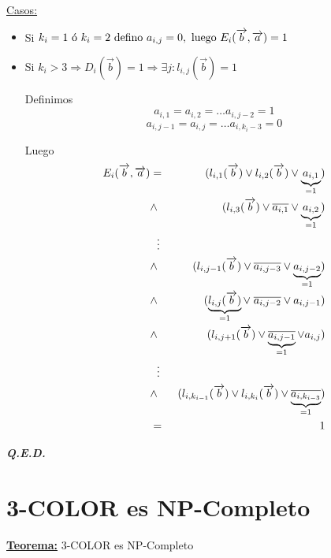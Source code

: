 \documentclass[12pt,a4paper]{report}
\newcommand{\QED}{\hfill \textit{\textbf{Q.E.D.}}}
\begin{document}
					\vspace{3mm}
					\underline{Casos:}
					\begin{itemize}
						\item Si $k_{i} = 1 \textup{ ó } k_{i} = 2 \textup{ defino } a_{i, j} = 0, \textup{ luego } E_{i}(\overrightarrow{b}, \overrightarrow{a}) = 1$
						\item Si $k_{i} > 3 \Rightarrow D_{i}(\overrightarrow{b}) = 1 \Rightarrow \exists j : l_{i, j}(\overrightarrow{b}) = 1$

							\par Definimos
								\[ a_{i, 1} = a_{i, 2} = \dotsc a_{i, j - 2} = 1 \]
								\[ a_{i, j - 1} = a_{i, j} = \dotsc a_{i, k_{i} - 3} = 0 \]

							\par Luego
							\begin{eqnarray}
								\nonumber E_{i}(\overrightarrow{b}, \overrightarrow{a}) &=& (l_{i, 1}(\overrightarrow{b}) \vee l_{i, 2}(\overrightarrow{b}) \vee \underbrace{a_{i, 1}}_{= 1}) \\
								\nonumber &\wedge & (l_{i, 3}(\overrightarrow{b}) \vee \overline{a_{i, 1}} \vee \underbrace{a_{i, 2}}_{=1}) \\
								\nonumber &\vdotswithin{\ldots}& \\
								\nonumber &\wedge & (l_{i, j-1}(\overrightarrow{b}) \vee \overline{a_{i, j-3}} \vee \underbrace{a_{i, j-2}}_{=1}) \\
								\nonumber &\wedge & (\underbrace{l_{i, j}(\overrightarrow{b})}_{=1} \vee \; \overline{a_{i, j-2}} \vee a_{i, j-1}) \\
								\nonumber &\wedge & (l_{i, j+1}(\overrightarrow{b}) \vee \underbrace{\overline{a_{i, j-1}}}_{=1} \vee a_{i, j}) \\
								\nonumber &\vdotswithin{\ldots}& \\
								\nonumber &\wedge & (l_{i, k_{i-1}}(\overrightarrow{b}) \vee l_{i, k_{i}}(\overrightarrow{b}) \vee \underbrace{\overline{a_{i, k_{i-3}}}}_{=1}) \\
								\nonumber &=& 1
							\end{eqnarray}
					\end{itemize}

		\QED

	\section{3-COLOR es NP-Completo}
		\textbf{\underline{Teorema:}} 3-COLOR es NP-Completo
\end{document}
